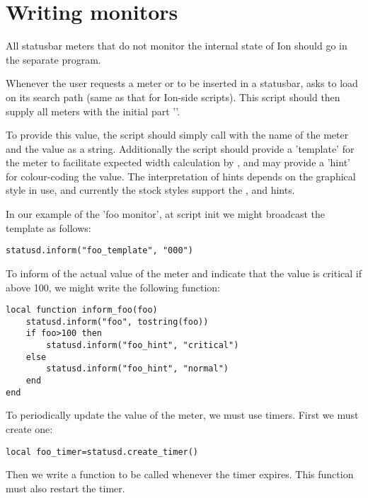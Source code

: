 
\section{Writing  monitors}

All statusbar meters that do not monitor the internal state of Ion should
go in the separate  program. 

Whenever the user requests a meter  or  to be 
inserted in a statusbar,  asks  to
load  on its search path (same as that for Ion-side 
scripts). This script should then supply all meters with the initial part
''.

To provide this value, the script should simply call 
with the name of the meter and the value as a string.
Additionally the script should provide a 'template' for the meter to
facilitate expected width calculation by , and
may provide a 'hint' for colour-coding the value. The interpretation
of hints depends on the graphical style in use, and currently the
stock styles support the ,  and 
 hints.


In our example of the 'foo monitor', at script init we might broadcast
the template as follows:

\begin{verbatim}
statusd.inform("foo_template", "000")
\end{verbatim}

To inform  of the actual value of the meter and
indicate that the value is critical if above 100, we might write the
following function:

\begin{verbatim}
local function inform_foo(foo)
    statusd.inform("foo", tostring(foo))
    if foo>100 then
        statusd.inform("foo_hint", "critical")
    else
        statusd.inform("foo_hint", "normal")
    end
end    
\end{verbatim}
    
To periodically update the value of the meter, we must use timers.
First we must create one:

\begin{verbatim}
local foo_timer=statusd.create_timer()
\end{verbatim}

Then we write a function to be called whenever the timer expires.
This function must also restart the timer.

